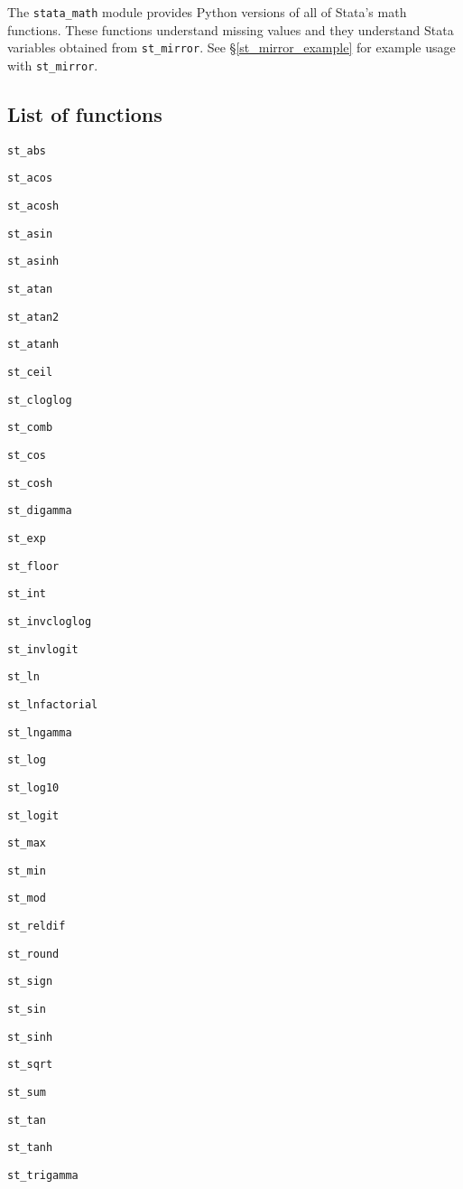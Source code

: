 \documentclass{article}
\begin{document}
The \lstinline{stata_math} module provides Python versions of all of Stata's math functions. These functions understand missing values and they understand Stata variables obtained from \lstinline{st_mirror}. See \S\ref{st_mirror_example} for example usage with \lstinline{st_mirror}.

\subsection{List of functions}

\begin{multicols}{3}
\setcounter{finalcolumnbadness}{0}

\lstinline$st_abs$

\lstinline$st_acos$

\lstinline$st_acosh$

\lstinline$st_asin$

\lstinline$st_asinh$

\lstinline$st_atan$

\lstinline$st_atan2$

\lstinline$st_atanh$

\lstinline$st_ceil$

\lstinline$st_cloglog$

\lstinline$st_comb$

\lstinline$st_cos$

\lstinline$st_cosh$

\lstinline$st_digamma$

\lstinline$st_exp$

\lstinline$st_floor$

\lstinline$st_int$

\lstinline$st_invcloglog$

\lstinline$st_invlogit$

\lstinline$st_ln$

\lstinline$st_lnfactorial$

\lstinline$st_lngamma$

\lstinline$st_log$

\lstinline$st_log10$

\lstinline$st_logit$

\lstinline$st_max$

\lstinline$st_min$

\lstinline$st_mod$

\lstinline$st_reldif$

\lstinline$st_round$

\lstinline$st_sign$
         
\lstinline$st_sin$

\lstinline$st_sinh$

\lstinline$st_sqrt$

\lstinline$st_sum$

\lstinline$st_tan$

\lstinline$st_tanh$

\lstinline$st_trigamma$

\end{multicols}
\end{document}
